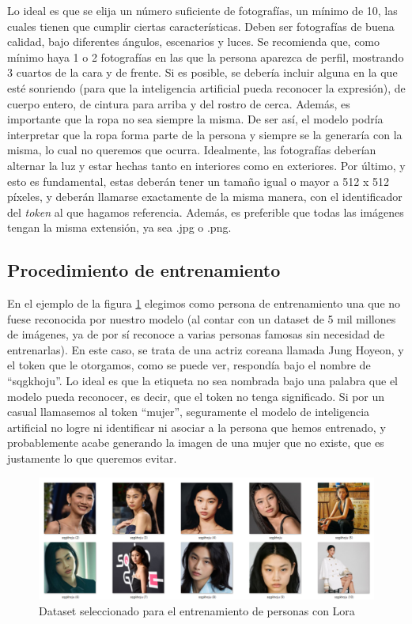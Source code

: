 Lo ideal es que se elija un número suficiente de fotografías, un mínimo de 10, las cuales tienen que cumplir ciertas características. Deben ser fotografías de buena calidad, bajo diferentes ángulos, escenarios y luces. Se recomienda que, como mínimo haya 1 o 2 fotografías en las que la persona aparezca de perfil, mostrando 3 cuartos de la cara y de frente. Si es posible, se debería incluir alguna en la que esté sonriendo (para que la inteligencia artificial pueda reconocer la expresión), de cuerpo entero, de cintura para arriba y del rostro de cerca. Además, es importante que la ropa no sea siempre la misma. De ser así, el modelo podría interpretar que la ropa forma parte de la persona y siempre se la generaría con la misma, lo cual no queremos que ocurra. Idealmente, las fotografías deberían alternar la luz y estar hechas tanto en interiores como en exteriores. Por último, y esto es fundamental, estas deberán tener un tamaño igual o mayor a 512 x 512 píxeles, y deberán llamarse exactamente de la misma manera, con el identificador del \textit{token} al que hagamos referencia. Además, es preferible que todas las imágenes tengan la misma extensión, ya sea .jpg o .png. 

\subsection{Procedimiento de entrenamiento}

En el ejemplo de la figura \ref{fig:datasethoyeon}  elegimos como persona de entrenamiento una que no fuese reconocida por nuestro modelo (al contar con un dataset de 5 mil millones de imágenes, ya de por sí reconoce a varias personas famosas sin necesidad de entrenarlas). En este caso, se trata de una actriz coreana llamada Jung Hoyeon, y el token que le otorgamos, como se puede ver, respondía bajo el nombre de ``sqgkhoju''. Lo ideal es que la etiqueta no sea nombrada bajo una palabra que el modelo pueda reconocer, es decir, que el token no tenga significado. Si por un casual llamasemos al token ``mujer'', seguramente el modelo de inteligencia artificial no logre ni identificar ni asociar a la persona que hemos entrenado, y probablemente acabe generando la imagen de una mujer que no existe, que es justamente lo que queremos evitar. \\

\begin{figure}[h]
	\centering
	\includegraphics[width = 1
	\textwidth]{Imagenes/Vectorial/datasethoyeon.png}
	\caption{Dataset seleccionado para el entrenamiento de personas con Lora}
	\label{fig:datasethoyeon}
\end{figure}

